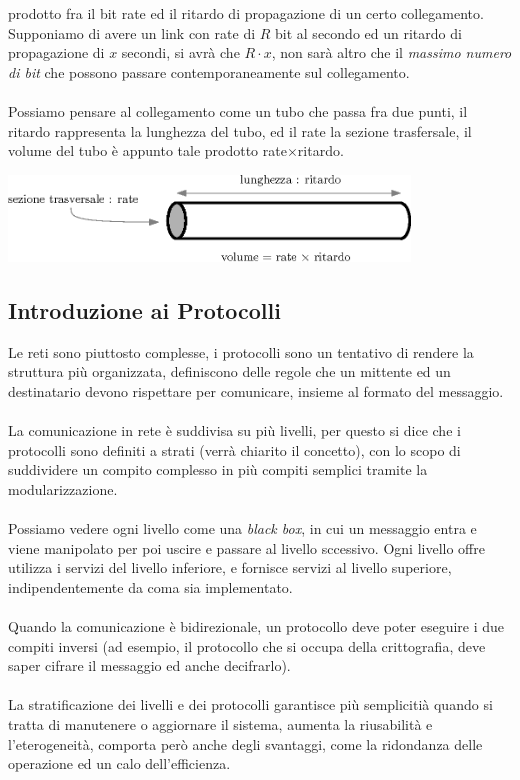 \documentclass[12pt, letterpaper]{article}
\newcommand{\acc}{\\\hphantom{}\\}
\begin{document}
prodotto fra il bit rate ed il ritardo di propagazione di un certo
collegamento. Supponiamo di avere un link con rate di $R$ bit al secondo ed un ritardo di propagazione
di $x$ secondi, si avrà che $R\cdot x$, non sarà altro che il \textit{massimo numero di bit} che
possono passare contemporaneamente sul collegamento.\acc
Possiamo pensare al collegamento come un tubo che passa fra due punti, il ritardo rappresenta la lunghezza
del tubo, ed il rate la sezione trasfersale, il volume del tubo è appunto tale prodotto rate$\times$ritardo.
\begin{center}
    \includegraphics[width=0.8\textwidth ]{images/tubo.eps}
\end{center}
\subsection{Introduzione ai Protocolli}
Le reti sono piuttosto complesse, i protocolli sono un tentativo di rendere la struttura più
organizzata, definiscono delle regole che un mittente ed un destinatario devono rispettare per
comunicare, insieme al formato del messaggio.\acc
La comunicazione in rete è suddivisa su più livelli, per questo si dice che i protocolli sono
definiti a strati (verrà chiarito il concetto), con lo scopo di suddividere un compito complesso
in più compiti semplici tramite la modularizzazione.\acc
Possiamo vedere ogni livello come una \textit{black box}, in cui un messaggio entra e viene
manipolato per poi uscire e passare al livello sccessivo. Ogni livello offre utilizza i servizi
del livello inferiore, e fornisce servizi al livello superiore, indipendentemente da coma sia implementato. \acc
Quando la comunicazione è bidirezionale, un protocollo deve poter eseguire i due compiti inversi (ad esempio,
il protocollo che si occupa della crittografia, deve saper cifrare il messaggio ed anche decifrarlo).\acc
La stratificazione dei livelli e dei protocolli garantisce più semplicitià quando si tratta di manutenere
o aggiornare il sistema, aumenta la riusabilità e l'eterogeneità, comporta però anche degli svantaggi,
come la ridondanza delle operazione ed un calo dell'efficienza.
\end{document}
